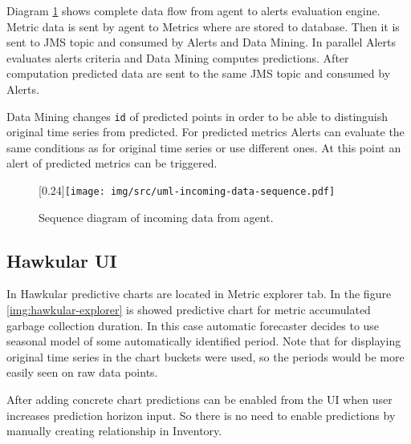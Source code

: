     Diagram \ref{img:sequence-incoming-data} shows complete data flow from agent to alerts evaluation engine.
    Metric data is sent by agent to Metrics where are stored to database. Then it is sent to JMS topic
    and consumed by Alerts and Data Mining. In parallel Alerts evaluates alerts criteria and Data Mining computes
    predictions. After computation predicted data are sent to the same JMS topic and consumed by Alerts.

    Data Mining changes \texttt{id} of predicted points in order to be able to distinguish original time series from
    predicted. For predicted metrics Alerts can evaluate the same conditions as for original time series or use
    different ones. At this point an alert of predicted metrics can be triggered.

    \begin{figure}[H]
        \begin{center}
            \scalebox{0.33}[0.24]{\texttt{[image: img/src/uml-incoming-data-sequence.pdf]}}
            \caption{Sequence diagram of incoming data from agent.}
            \label{img:sequence-incoming-data}
        \end{center}
    \end{figure}

        \subsection{Hawkular UI}
        In Hawkular predictive charts are located in Metric explorer tab. In the figure \ref{img:hawkular-explorer}
        is showed predictive chart for metric accumulated garbage collection duration. In this case automatic
        forecaster decides to use seasonal model of some automatically identified period. Note that for displaying
        original time series in the chart buckets were used, so the periods would be more easily seen on raw data
        points.

        After adding concrete chart predictions can be enabled from the UI when user increases prediction horizon input.
        So there is no need to enable predictions by manually creating relationship in Inventory.

